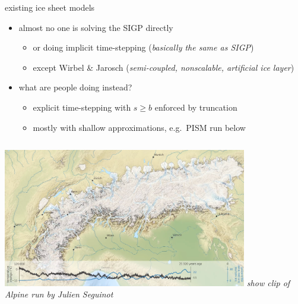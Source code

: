 \documentclass[usepdftitle=false]{beamer}
\begin{document}
\begin{frame}{existing ice sheet models}

\begin{itemize}
\item almost no one is solving the SIGP directly
    \begin{itemize}
    \item or doing implicit time-stepping (\emph{basically the same as SIGP})
    \item except Wirbel \& Jarosch \cite{WirbelJarosch2020} (\emph{semi-coupled, nonscalable, artificial ice layer})
    \end{itemize}
\item what are people doing instead?
    \begin{itemize}
    \item \alert{explicit time-stepping with $s \ge b$ enforced by truncation}
    \item mostly with shallow approximations, e.g.~PISM run below
    \end{itemize}
\end{itemize}

\medskip
\begin{columns}
        \hfill \includegraphics[width=0.8\textwidth]{figs/seguinot.png}
        \scriptsize \emph{show clip of Alpine run by Julien Seguinot}
\end{columns}
\end{frame}
\end{document}
